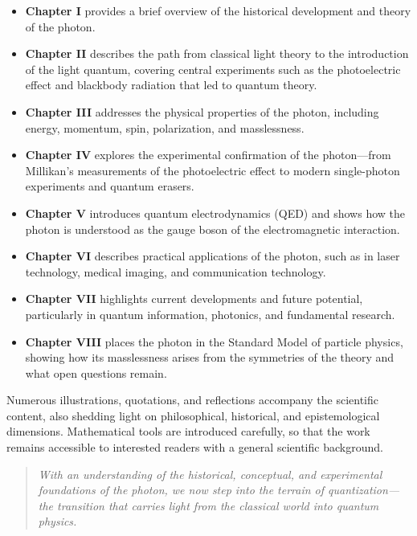 \begin{itemize}
		\item \textbf{Chapter I} provides a brief overview of the historical development and theory of the photon.
	\item \textbf{Chapter II} describes the path from classical light theory to the introduction of the light quantum, covering central experiments such as the photoelectric effect and blackbody radiation that led to quantum theory.
	
	\item \textbf{Chapter III} addresses the physical properties of the photon, including energy, momentum, spin, polarization, and masslessness.
	
	\item \textbf{Chapter IV} explores the experimental confirmation of the photon—from Millikan’s measurements of the photoelectric effect to modern single-photon experiments and quantum erasers.
	
	\item \textbf{Chapter V} introduces quantum electrodynamics (QED) and shows how the photon is understood as the gauge boson of the electromagnetic interaction.
	
	\item \textbf{Chapter VI} describes practical applications of the photon, such as in laser technology, medical imaging, and communication technology.
	
	\item \textbf{Chapter VII} highlights current developments and future potential, particularly in quantum information, photonics, and fundamental research.
	
	\item \textbf{Chapter VIII} places the photon in the Standard Model of particle physics, showing how its masslessness arises from the symmetries of the theory and what open questions remain.
\end{itemize}
Numerous illustrations, quotations, and reflections accompany the scientific content, also shedding light on philosophical, historical, and epistemological dimensions. Mathematical tools are introduced carefully, so that the work remains accessible to interested readers with a general scientific background.

\begin{quote}
	\textit{With an understanding of the historical, conceptual, and experimental foundations of the photon, we now step into the terrain of quantization—the transition that carries light from the classical world into quantum physics.}
\end{quote}


